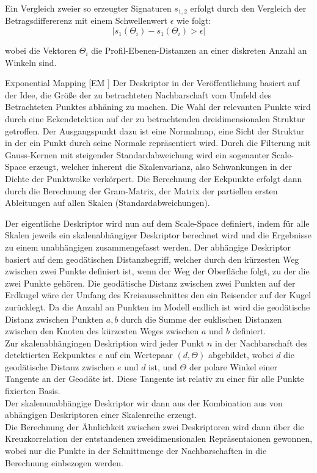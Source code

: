 \documentclass[12pt]{article}
\begin{document}
{	Ein Vergleich zweier so erzeugter Signaturen $s_{1,2}$ erfolgt durch den Vergleich der Betragsdiffererenz mit einem Schwellenwert $\epsilon$ wie folgt: \\

	$$|s_1(\Theta_i)-s_1(\Theta_i) > \epsilon|$$

	wobei die Vektoren $\Theta_i$ die Profil-Ebenen-Distanzen an einer diskreten Anzahl an Winkeln sind. 

	\item[Exponential Mapping [EM] \cite{em}]\label{EM} Der Deskriptor in der Veröffentlichung basiert auf der Idee, die Größe der zu betrachteten Nachbarschaft vom Umfeld des Betrachteten Punktes abhäning zu machen. Die Wahl der relevanten Punkte wird durch eine Eckendetektion auf der zu betrachtenden dreidimensionalen Struktur getroffen. Der Ausgangspunkt dazu ist eine Normalmap, eine Sicht der Struktur in der ein Punkt durch seine Normale repräsentiert wird. Durch die Filterung mit Gauss-Kernen mit steigender Standardabweichung wird ein sogenanter Scale-Space erzeugt, welcher inherent die Skalenvarianz, also Schwankungen in der Dichte der Punktwolke verkörpert. Die Berechnung der Eckpunkte erfolgt dann durch die Berechnung der Gram-Matrix, der Matrix der partiellen ersten Ableitungen auf allen Skalen (Standardabweichungen).

	Der eigentliche Deskriptor wird nun auf dem Scale-Space definiert, indem für alle Skalen jeweils ein skalenabhängiger Deskriptor berechnet wird und die Ergebnisse zu einem unabhängigen zusammengefasst werden. Der abhängige Deskriptor basiert auf dem geodätischen Distanzbegriff, welcher durch den kürzesten Weg zwischen zwei Punkte definiert ist, wenn der Weg der Oberfläche folgt, zu der die zwei Punkte gehören. Die geodätische Distanz zwischen zwei Punkten auf der Erdkugel wäre der Umfang des Kreisausschnittes den ein Reisender auf der Kugel zurücklegt. Da die Anzahl an Punkten im Modell endlich ist wird die geodätische Distanz zwischen Punkten $a,b$ durch die Summe der euklischen Distanzen zwischen den Knoten des kürzesten Weges zwischen $a$ und $b$ definiert. \\

Zur skalenabhängingen Deskription wird jeder Punkt $n$ in der Nachbarschaft des detektierten Eckpunktes $e$ auf ein Wertepaar $(d,\Theta)$ abgebildet, wobei $d$ die geodätische Distanz zwischen $e$ und $d$ ist, und $\Theta$ der polare Winkel einer Tangente an der Geodäte ist. Diese Tangente ist relativ zu einer für alle Punkte fixierten Basis.\\

Der skalenunabhängige Deskriptor wir dann aus der Kombination aus von abhängigen Deskriptoren einer Skalenreihe erzeugt.\\
Die Berechnung der Ähnlichkeit zwischen zwei Deskriptoren wird dann über die Kreuzkorrelation der entstandenen zweidimensionalen Repräsentaionen gewonnen, wobei nur die Punkte in der Schnittmenge der Nachbarschaften in die Berechnung einbezogen werden.

}
\end{document}
